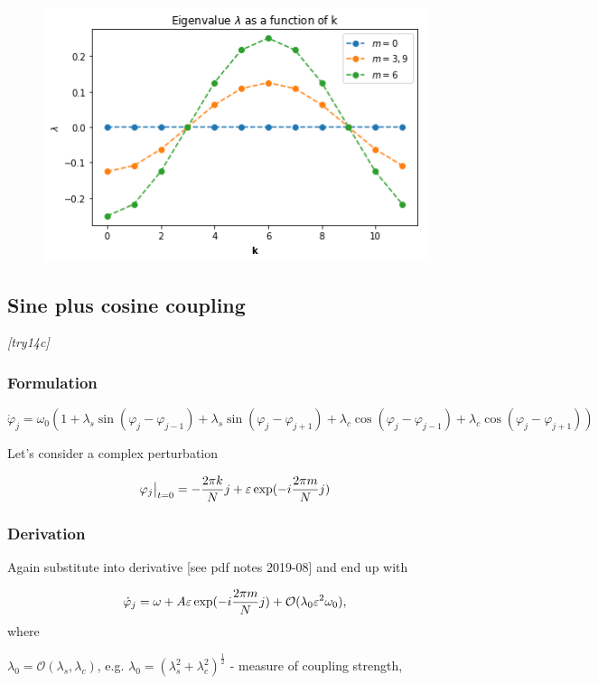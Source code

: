 \documentclass[a4paper,12pt]{article}
\newcommand*{\eps}{\varepsilon}
\newcommand*{\bigO}{\mathcal{O}}
\begin{document}
\begin{figure}[h]
    \centering
    \includegraphics[width=.6\textwidth]{assets/theory-2019-08-27-181132121-3da.png}
\end{figure}


\clearpage

\subsection{Sine plus cosine coupling}
\textit{[try14c]}

\subsubsection{Formulation}


\begin{equation}
\dot \varphi_j = \omega_0 \left( 
1 
+ \lambda_s \sin(\varphi_j - \varphi_{j-1})
+ \lambda_s \sin(\varphi_j - \varphi_{j+1})
+ \lambda_c \cos(\varphi_j - \varphi_{j-1})
+ \lambda_c \cos(\varphi_j - \varphi_{j+1}) \right)
\label{eqn:dphidt-sin-cos}
\end{equation}

Let's consider a complex perturbation

$$
\varphi_j \big\rvert_{t=0} = - \fr{k}{j} + \eps \exp( - i \fr{m}{j})
$$

\subsubsection{Derivation}

Again substitute into derivative [see pdf notes 2019-08] and end up with

$$
\dot \varphi_j = \omega + A \eps \exp(- i \fr{m}{j}) + \bigO(\lambda_0 \eps ^ 2 \omega_0),
$$
where 

$\lambda_0 = \bigO(\lambda_s, \lambda_c)$, e.g. $\lambda_0 = \left( \lambda_s^2 + \lambda_c^2 \right)^{\frac{1}{2}}$ - measure of coupling strength,
\end{document}
